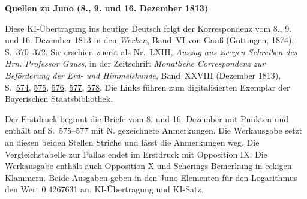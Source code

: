 \clearpage\thispagestyle{empty}
\begin{center}\textbf{Quellen zu Juno (8., 9. und 16. Dezember 1813)}\end{center}
\noindent Diese KI-Übertragung ins heutige Deutsch folgt der Korrespondenz vom 8., 9. und 16. Dezember 1813 in den \href{https://gdz.sub.uni-goettingen.de/id/PPN236007467}{\textit{Werken}, Band~VI} von Gauß (Göttingen, 1874), S.~370--372. Sie erschien zuerst als Nr.~LXIII, \textit{Auszug aus zweyen Schreiben des Hrn. Professor Gauss}, in der Zeitschrift \textit{Monatliche Correspondenz zur Beförderung der Erd- und Himmelskunde}, Band~XXVIII (Dezember 1813), S.~\href{https://api.digitale-sammlungen.de/iiif/image/v2/bsb10538617_00590/full/1600,/0/default.jpg}{574}, \href{https://api.digitale-sammlungen.de/iiif/image/v2/bsb10538617_00591/full/1600,/0/default.jpg}{575}, \href{https://api.digitale-sammlungen.de/iiif/image/v2/bsb10538617_00592/full/1600,/0/default.jpg}{576}, \href{https://api.digitale-sammlungen.de/iiif/image/v2/bsb10538617_00593/full/1600,/0/default.jpg}{577}, \href{https://api.digitale-sammlungen.de/iiif/image/v2/bsb10538617_00594/full/1600,/0/default.jpg}{578}. Die Links führen zum digitalisierten Exemplar der Bayerischen Staatsbibliothek.
\par\smallskip\noindent Der Erstdruck beginnt die Briefe vom 8. und 16. Dezember mit Punkten und enthält auf S.~575--577 mit N. gezeichnete Anmerkungen. Die Werkausgabe setzt an diesen beiden Stellen Striche und lässt die Anmerkungen weg. Die Vergleichstabelle zur Pallas endet im Erstdruck mit Opposition IX. Die Werkausgabe enthält auch Opposition X und Scherings Bemerkung in eckigen Klammern. Beide Ausgaben geben in den Juno-Elementen für den Logarithmus den Wert 0.4267631 an. KI-Übertragung und KI-Satz.
\clearpage
